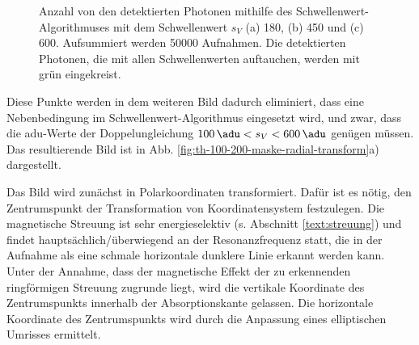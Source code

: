 \begin{figure}[H]
    \centering
    
    \caption{Anzahl von den detektierten Photonen mithilfe des Schwellenwert-Algorithmuses mit dem Schwellenwert $s_V$ (a) \SI{180}{\adu}, (b) \SI{450}{\adu} und (c) \SI{600}{\adu}. Aufsummiert werden \num{50000} Aufnahmen. Die detektierten Photonen, die mit allen Schwellenwerten auftauchen, werden mit grün eingekreist.}
    \label{fig:th_180_450_600}
\end{figure}
\noindent
Diese Punkte werden in dem weiteren Bild dadurch eliminiert, dass eine Nebenbedingung im Schwellenwert-Algorithmus eingesetzt wird, und zwar, dass die \gls{adu}-Werte der Doppelungleichung $\SI{100}{\adu} < s_V < \SI{600}{\adu}$ genügen müssen. Das resultierende Bild ist in Abb. \ref{fig:th-100-200-maske-radial-transform}a) dargestellt.

\noindent
Das Bild wird zunächst in Polarkoordinaten transformiert. Dafür ist es nötig, den Zentrumspunkt der Transformation von Koordinatensystem festzulegen. Die magnetische Streuung ist sehr energieselektiv (s. Abschnitt \ref{text:streuung}) und findet hauptsächlich/überwiegend an der Resonanzfrequenz statt, die in der Aufnahme als eine schmale horizontale dunklere Linie erkannt werden kann. Unter der Annahme, dass der magnetische Effekt der zu erkennenden ringförmigen Streuung zugrunde liegt, wird die vertikale Koordinate des Zentrumspunkts innerhalb der Absorptionskante gelassen. Die horizontale Koordinate des Zentrumspunkts wird durch die Anpassung eines elliptischen Umrisses ermittelt.


